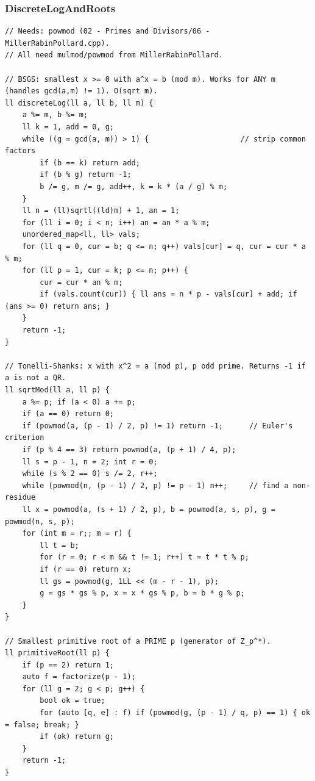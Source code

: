 \documentclass[9pt,a4paper,twocolumn]{extarticle}
\begin{document}
\filbreak
\subsubsection{DiscreteLogAndRoots}
\nopagebreak
\begin{lstlisting}
// Needs: powmod (02 - Primes and Divisors/06 - MillerRabinPollard.cpp).
// All need mulmod/powmod from MillerRabinPollard.

// BSGS: smallest x >= 0 with a^x = b (mod m). Works for ANY m (handles gcd(a,m) != 1). O(sqrt m).
ll discreteLog(ll a, ll b, ll m) {
    a %= m, b %= m;
    ll k = 1, add = 0, g;
    while ((g = gcd(a, m)) > 1) {                     // strip common factors
        if (b == k) return add;
        if (b % g) return -1;
        b /= g, m /= g, add++, k = k * (a / g) % m;
    }
    ll n = (ll)sqrtl((ld)m) + 1, an = 1;
    for (ll i = 0; i < n; i++) an = an * a % m;
    unordered_map<ll, ll> vals;
    for (ll q = 0, cur = b; q <= n; q++) vals[cur] = q, cur = cur * a % m;
    for (ll p = 1, cur = k; p <= n; p++) {
        cur = cur * an % m;
        if (vals.count(cur)) { ll ans = n * p - vals[cur] + add; if (ans >= 0) return ans; }
    }
    return -1;
}

// Tonelli-Shanks: x with x^2 = a (mod p), p odd prime. Returns -1 if a is not a QR.
ll sqrtMod(ll a, ll p) {
    a %= p; if (a < 0) a += p;
    if (a == 0) return 0;
    if (powmod(a, (p - 1) / 2, p) != 1) return -1;      // Euler's criterion
    if (p % 4 == 3) return powmod(a, (p + 1) / 4, p);
    ll s = p - 1, n = 2; int r = 0;
    while (s % 2 == 0) s /= 2, r++;
    while (powmod(n, (p - 1) / 2, p) != p - 1) n++;     // find a non-residue
    ll x = powmod(a, (s + 1) / 2, p), b = powmod(a, s, p), g = powmod(n, s, p);
    for (int m = r;; m = r) {
        ll t = b;
        for (r = 0; r < m && t != 1; r++) t = t * t % p;
        if (r == 0) return x;
        ll gs = powmod(g, 1LL << (m - r - 1), p);
        g = gs * gs % p, x = x * gs % p, b = b * g % p;
    }
}

// Smallest primitive root of a PRIME p (generator of Z_p^*).
ll primitiveRoot(ll p) {
    if (p == 2) return 1;
    auto f = factorize(p - 1);
    for (ll g = 2; g < p; g++) {
        bool ok = true;
        for (auto [q, e] : f) if (powmod(g, (p - 1) / q, p) == 1) { ok = false; break; }
        if (ok) return g;
    }
    return -1;
}


\end{lstlisting}
\end{document}
